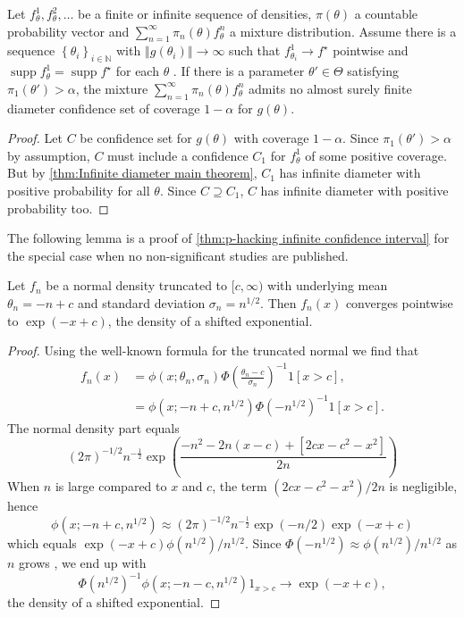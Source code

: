 \documentclass[twoside]{article}
\DeclareMathOperator{\supp}{supp}
\begin{document}
\begin{cor}
\label{cor:Mixture model corollary}Let $f_{\theta}^{1},f_{\theta}^{2},\ldots$
be a finite or infinite sequence of densities, $\pi(\theta)$
a countable probability vector and $\sum_{n=1}^{\infty}\pi_{n}(\theta)f_{\theta}^{n}$
a mixture distribution. Assume there is a sequence $\left\{ \theta_{i}\right\} _{i\in\mathbb{N}}$
with $\left\Vert g(\theta_{i})\right\Vert \to\infty$ such
that $f_{\theta_{i}}^{1}\to f^{\star}$ pointwise and $\supp f_{\theta}^{1} = \supp f^{\star}$
for each $\theta$ . If there is a parameter $\theta'\in\Theta$ satisfying
$\pi_{1}(\theta')>\alpha$, the mixture $\sum_{n=1}^{\infty}\pi_{n}(\theta)f_{\theta}^{n}$
admits no almost surely finite diameter confidence set of coverage
$1-\alpha$ for $g(\theta)$.
\end{cor}

\begin{proof}
Let $C$ be confidence set for $g(\theta)$ with coverage
$1-\alpha$. Since $\pi_{1}(\theta')>\alpha$ by assumption,
$C$ must include a confidence $C_{1}$ for $f_{\theta}^{1}$ of some
positive coverage. But by \cref{thm:Infinite diameter main theorem},
$C_{1}$ has infinite diameter with positive probability for all $\theta$.
Since $C\supseteq C_{1}$, $C$ has infinite diameter with positive
probability too.
\end{proof}
The following lemma is a proof of \cref{thm:p-hacking infinite confidence interval} for the special case when no non-significant studies are published.


\begin{lem} \label{lem:One-sided normal limit}
Let $f_n$ be a normal density truncated to $[c,\infty)$ with underlying mean $\theta_{n}=-n+c$ and standard deviation $\sigma_{n}=n^{1/2}$. Then $f_n(x)$ converges pointwise to $\exp(-x+c)$, the density of a shifted exponential.
\end{lem}
\begin{proof}
Using the well-known formula for the truncated normal we find that 
\begin{align*}
f_n(x) & = \phi(x; \theta_n, \sigma_n)\Phi\left(\frac{\theta_n - c}{\sigma_n}\right)^{-1}1[x>c], \\
 & = \phi(x;-n+c,n^{1/2})\Phi(-n^{1/2})^{-1}1[x>c].
\end{align*}
The normal density part equals 
\[
(2\pi)^{-1/2}n^{-\frac{1}{2}}\exp\left(\frac{-n^{2}-2n(x-c)+[2cx-c^{2}-x^{2}]}{2n}\right)
\]
When $n$ is large compared to $x$ and $c$, the term $(2cx-c^{2}-x^{2})/2n$
is negligible, hence 
\[
\phi(x;-n+c,n^{1/2})\approx(2\pi)^{-1/2}n^{-\frac{1}{2}}\exp(-n/2)\exp(-x+c)
\]
which equals $\exp(-x+c)\phi(n^{1/2})/n^{1/2}$.
Since $\Phi(-n^{1/2})\approx \phi(n^{1/2})/n^{1/2}$
as $n$ grows \citep[Equation 5]{borjesson1979simple},
we end up with $$\Phi(n^{1/2})^{-1}\phi(x;-n-c,n^{1/2})1_{x>c}\to\exp(-x+c),$$
the density of a shifted exponential.
\end{proof}
\end{document}
